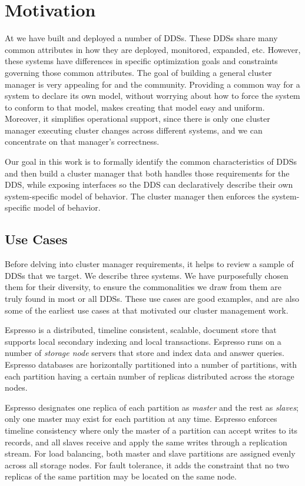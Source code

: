 \section{Motivation}
\label{sec:motivation}
%
At \linkedin we have built and deployed a number of DDSs.
These DDSs share many common attributes in how they are deployed, monitored, expanded, etc.  
However, these systems have differences in
 specific optimization goals and constraints governing those common attributes.
The goal of building a general cluster manager is very appealing for \linkedin and the community.  
Providing a common way for a system to declare 
its own model, without worrying about how to force the system to conform to that model, makes creating 
that model easy and uniform.  Moreover, it simplifies operational support, since there is only one 
cluster manager executing cluster changes across different systems, and we can concentrate on that 
manager's correctness.

  Our goal in this work is to 
formally identify the common characteristics of DDSs and then build a cluster manager that 
both handles those requirements for the DDS, while exposing interfaces so the DDS can declaratively
describe their own system-specific model of behavior. The cluster manager then enforces the system-specific model of behavior. 

 

\subsection{Use Cases}
\label{sec:usecases}
%
Before delving into cluster manager requirements, it helps to review a sample of DDSs that we 
target.  We describe three \linkedin systems.  We have purposefully chosen them for their diversity,
to ensure the commonalities we draw from them are truly found in most or all
DDSs.  These use cases are good examples, and are also some of the earliest use
cases at \linkedin that motivated our cluster management work.


Espresso is a distributed, timeline consistent, scalable, document store that 
supports local secondary indexing and local transactions.  Espresso runs on a 
number of \emph{storage node} servers that store and index data and 
answer queries. Espresso databases are horizontally partitioned into a number of partitions, 
with each partition having a certain number of replicas distributed across the 
storage nodes.

Espresso designates one replica of each partition as \emph{master} and the rest as \emph{slaves}; only
one master may exist for each partition at any time.  
Espresso enforces timeline consistency where only the master of a
partition can accept writes to its records, and all slaves receive and apply the same writes through a replication stream.  For load balancing, both master and slave
partitions are assigned evenly across all storage nodes.  For fault tolerance, it adds the constraint that no   
two replicas of the same partition may be located on the same node.

